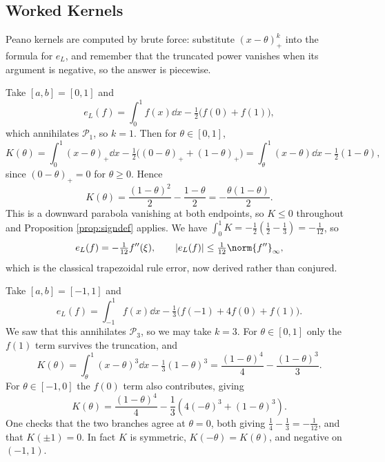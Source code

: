 \documentclass[a4paper]{scrartcl}
\providecommand{\abs}[1]{\left\lvert#1\right\rvert}
\renewcommand{\abs}[1]{\left\lvert#1\right\rvert}
\newcommand{\Pn}[1]{\mathcal{P}_{#1}}
\begin{document}
\subsection{Worked Kernels}

Peano kernels are computed by brute force: substitute $(x-\theta)_+^k$ into the formula for $e_L$, and remember that the truncated power vanishes when its argument is negative, so the answer is piecewise.

\begin{example}\label{eg:trapkernel}
  Take $[a,b] = [0,1]$ and
  $$
  e_L(f) = \int_0^1 f(x)\dd x - \tfrac12\big(f(0) + f(1)\big),
  $$
  which annihilates $\Pn{1}$, so $k = 1$. Then for $\theta \in [0,1]$,
  $$
  K(\theta) = \int_0^1 (x-\theta)_+\dd x - \tfrac12\big((0-\theta)_+ + (1-\theta)_+\big) = \int_\theta^1 (x - \theta)\dd x - \tfrac12(1-\theta),
  $$
  since $(0-\theta)_+ = 0$ for $\theta \geq 0$. Hence
  $$
  K(\theta) = \frac{(1-\theta)^2}{2} - \frac{1-\theta}{2} = -\frac{\theta(1-\theta)}{2}.
  $$
  This is a downward parabola vanishing at both endpoints, so $K \leq 0$ throughout and Proposition \ref{prop:signdef} applies. We have $\int_0^1 K = -\tfrac12(\tfrac12 - \tfrac13) = -\tfrac1{12}$, so
  $$
  e_L(f) = -\tfrac{1}{12}f''(\xi), \qquad \abs{e_L(f)} \leq \tfrac{1}{12}\norm{f''}_\infty,
  $$
  which is the classical trapezoidal rule error, now derived rather than conjured.
\end{example}

\begin{example}\label{eg:simpsonkernel}
  Take $[a,b] = [-1,1]$ and
  $$
  e_L(f) = \int_{-1}^1 f(x)\dd x - \tfrac13\big(f(-1) + 4f(0) + f(1)\big).
  $$
  We saw that this annihilates $\Pn{3}$, so we may take $k = 3$. For $\theta \in [0,1]$ only the $f(1)$ term survives the truncation, and
  $$
  K(\theta) = \int_\theta^1 (x-\theta)^3\dd x - \tfrac13(1-\theta)^3 = \frac{(1-\theta)^4}{4} - \frac{(1-\theta)^3}{3}.
  $$
  For $\theta \in [-1,0]$ the $f(0)$ term also contributes, giving
  $$
  K(\theta) = \frac{(1-\theta)^4}{4} - \frac{1}{3}\left(4(-\theta)^3 + (1-\theta)^3\right).
  $$
  One checks that the two branches agree at $\theta = 0$, both giving $\tfrac14 - \tfrac13 = -\tfrac1{12}$, and that $K(\pm 1) = 0$. In fact $K$ is symmetric, $K(-\theta) = K(\theta)$, and negative on $(-1,1)$.
\end{example}
\end{document}
